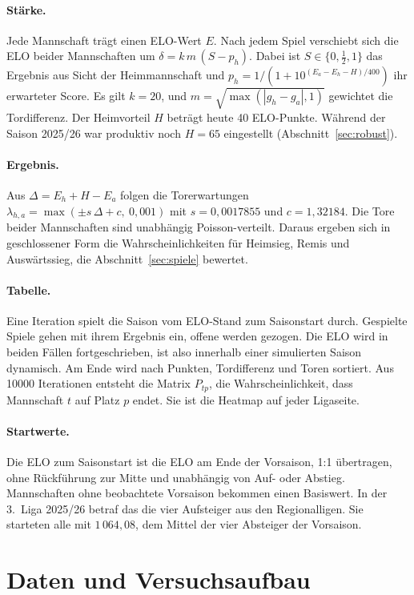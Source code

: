 \documentclass[11pt,a4paper,parskip=half,numbers=noenddot]{scrartcl}
\begin{document}
\paragraph{Stärke.} Jede Mannschaft trägt einen ELO-Wert $E$. Nach jedem
Spiel verschiebt sich die ELO beider Mannschaften um
$\delta = k\,m\,(S - p_h)$. Dabei ist $S \in \{0, \frac12, 1\}$ das Ergebnis
aus Sicht der Heimmannschaft und $p_h = 1/(1+10^{(E_a - E_h - H)/400})$ ihr
erwarteter Score. Es gilt $k = 20$, und $m = \sqrt{\max(|g_h - g_a|, 1)}$
gewichtet die Tordifferenz. Der Heimvorteil $H$ beträgt heute 40
ELO-Punkte. Während der Saison 2025/26 war produktiv noch $H = 65$
eingestellt (Abschnitt~\ref{sec:robust}).

\paragraph{Ergebnis.} Aus $\Delta = E_h + H - E_a$ folgen die
Torerwartungen $\lambda_{h,a} = \max(\pm s\,\Delta + c,\ 0{,}001)$ mit
$s = 0{,}0017855$ und $c = 1{,}32184$. Die Tore beider Mannschaften sind
unabhängig Poisson-verteilt. Daraus ergeben sich in geschlossener Form die
Wahrscheinlichkeiten für Heimsieg, Remis und Auswärtssieg, die
Abschnitt~\ref{sec:spiele} bewertet.

\paragraph{Tabelle.} Eine Iteration spielt die Saison vom ELO-Stand zum
Saisonstart durch. Gespielte Spiele gehen mit ihrem Ergebnis ein, offene
werden gezogen. Die ELO wird in beiden Fällen fortgeschrieben, ist also
innerhalb einer simulierten Saison dynamisch. Am Ende wird nach Punkten,
Tordifferenz und Toren sortiert. Aus \num{10000} Iterationen entsteht die
Matrix $P_{tp}$, die Wahrscheinlichkeit, dass Mannschaft $t$ auf Platz $p$
endet. Sie ist die Heatmap auf jeder Ligaseite.

\paragraph{Startwerte.} Die ELO zum Saisonstart ist die ELO am Ende der
Vorsaison, 1:1 übertragen, ohne Rückführung zur Mitte und unabhängig von
Auf- oder Abstieg. Mannschaften ohne beobachtete Vorsaison bekommen einen
Basiswert. In der 3.~Liga 2025/26 betraf das die vier Aufsteiger aus den
Regionalligen. Sie starteten alle mit $1\,064{,}08$, dem Mittel der vier
Absteiger der Vorsaison.

\section{Daten und Versuchsaufbau}\label{sec:aufbau}
\end{document}

